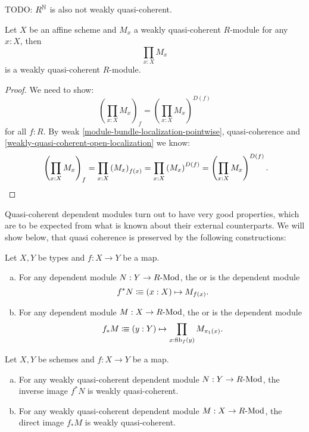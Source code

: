 TODO: $R^{\mathbb{N}}$ is also not weakly quasi-coherent.

\begin{lemma}%
  \label{weakly-quasi-coherent-pi}
  Let $X$ be an affine scheme and $M_x$ a weakly quasi-coherent $R$-module for any $x:X$,
  then
  \[
    \prod_{x:X}M_x
  \]
  is a weakly quasi-coherent $R$-module.
\end{lemma}

\begin{proof}
  We need to show:
  \[
    \left(\prod_{x:X}M_x\right)_f=\left(\prod_{x:X}M_x\right)^{D(f)}
  \]
  for all $f:R$.
  By weak \cref{module-bundle-localization-pointwise}, quasi-coherence
  and \cref{weakly-quasi-coherent-open-localization}
  we know:
  \[
    \left(\prod_{x:X}M_x\right)_f
    =\prod_{x:X}\left(M_x\right)_{f(x)}
    =\prod_{x:X}\left(M_x\right)^{D(f)}
    =\left(\prod_{x:X}M_x\right)^{D(f)}
    \rlap{.}
  \]
\end{proof}

Quasi-coherent dependent modules turn out to have very good properties,
which are to be expected from what is known about their external counterparts.
We will show below, that quasi coherence is preserved by the following constructions:

\begin{definition}
  \label{pullback-push-forward}
  Let $X,Y$ be types and $f:X\to Y$ be a map.
  \begin{enumerate}[(a)]
  \item {} For any dependent module $N:Y\to R\text{-}\mathrm{Mod}$,
    the  or  is the dependent module
    \[
      f^*N\colonequiv (x:X) \mapsto M_{f(x)}\rlap{.}
    \]
  \item {} For any dependent module $M:X\to R\text{-}\mathrm{Mod}$,
    the  or  is the dependent module
    \[
      f_*M\colonequiv (y:Y) \mapsto \prod_{x:\fib_f(y)}M_{\pi_1(x)}\rlap{.}
    \]
  \end{enumerate}
\end{definition}

\begin{theorem}%
  \label{pullback-push-forward-qcoh}
  Let $X,Y$ be schemes and $f:X\to Y$ be a map.
  \begin{enumerate}[(a)]
  \item For any weakly quasi-coherent dependent module $N:Y\to R\text{-}\mathrm{Mod}$,
    the inverse image $f^*N$ is weakly quasi-coherent.
  \item For any weakly quasi-coherent dependent module $M:X\to R\text{-}\mathrm{Mod}$,
    the direct image $f_*M$ is weakly quasi-coherent.
  \end{enumerate}
\end{theorem}

